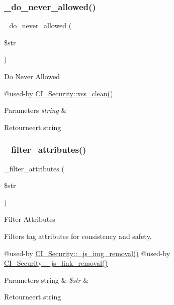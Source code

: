 \subsubsection{\texorpdfstring{\_do\_never\_allowed()}{\_do\_never\_allowed()}}
{\footnotesize\ttfamily \+\_\+do\+\_\+never\+\_\+allowed (\begin{DoxyParamCaption}\item[{}]{\$str }\end{DoxyParamCaption})\hspace{0.3cm}{\ttfamily [protected]}}

Do Never Allowed

@used-\/by \mbox{\hyperlink{class_c_i___security_acb759426dbab128d3d8164805225381c}{C\+I\+\_\+\+Security\+::xss\+\_\+clean()}} 
\begin{DoxyParams}{Parameters}
{\em string} & \\
\hline
\end{DoxyParams}
\begin{DoxyReturn}{Retourneert}
string 
\end{DoxyReturn}
\mbox{\label{class_c_i___security_aa385a9c7527f5eece656b9cac73979d3}} 
\subsubsection{\texorpdfstring{\_filter\_attributes()}{\_filter\_attributes()}}
{\footnotesize\ttfamily \+\_\+filter\+\_\+attributes (\begin{DoxyParamCaption}\item[{}]{\$str }\end{DoxyParamCaption})\hspace{0.3cm}{\ttfamily [protected]}}

Filter Attributes

Filters tag attributes for consistency and safety.

@used-\/by \mbox{\hyperlink{class_c_i___security_a5c5e91dc8e3df0174e4e074dd375a8db}{C\+I\+\_\+\+Security\+::\+\_\+js\+\_\+img\+\_\+removal()}} @used-\/by \mbox{\hyperlink{class_c_i___security_a6b1744acaf85e05c65ab17242dea4f06}{C\+I\+\_\+\+Security\+::\+\_\+js\+\_\+link\+\_\+removal()}} 
\begin{DoxyParams}[1]{Parameters}
string & {\em \$str} & \\
\hline
\end{DoxyParams}
\begin{DoxyReturn}{Retourneert}
string 
\end{DoxyReturn}
\mbox{\label{class_c_i___security_a5c5e91dc8e3df0174e4e074dd375a8db}} 
